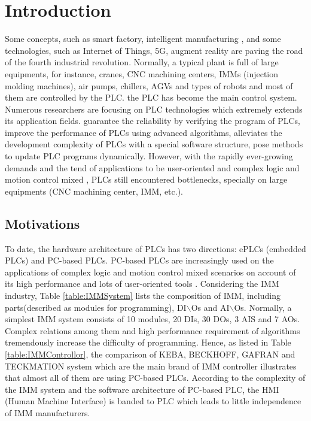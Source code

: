 \documentclass[journal,UTF8]{IEEEtran}
\begin{document}
\section{Introduction}
Some concepts, such as smart factory, intelligent manufacturing \cite{Gonzalez2017Supervisory,Chekired2018Industrial}, and some technologies, such as Internet of Things, 5G, augment reality \cite{Li2018Energy,Ling20185G} are paving the road of the fourth industrial revolution. Normally, a typical plant is full of large equipments, for instance, cranes, CNC machining centers, IMMs (injection molding machines), air pumps, chillers, AGVs and types of robots and most of them are controlled by the PLC. the PLC has become the main control system. Numerous researchers are focusing on PLC technologies which extremely extends its application fields. \cite{Carlsson2012Methods,Obermeier2015A,Adiego2015Applying} guarantee the reliability by verifying the program of PLCs, \cite{Gerk2006Advanced,Chang2007Adaptive,Dominic2016PLC} improve the performance of PLCs using advanced algorithms, \cite{WuA} alleviates the development complexity of PLCs with a special software structure, \cite{Sch2013Development,Morenas2017Shop} pose methods to update PLC programs dynamically.
However, with the rapidly ever-growing demands and the tend of applications to be user-oriented and complex logic and motion control mixed \cite{Zaeh2005A,Hossain2014Advanced}, PLCs still encountered bottlenecks, specially on large equipments (CNC machining center, IMM, etc.).

\subsection{Motivations}
To date, the hardware architecture of PLCs has two directions: ePLCs (embedded PLCs) and PC-based PLCs. PC-based PLCs are increasingly used on the applications of complex logic and motion control mixed scenarios on account of its high performance and lots of user-oriented tools \cite{Hossain2014Advanced}. Considering the IMM industry, Table \ref{table:IMMSystem} lists the composition of IMM, including parts(described as modules for programming), DI$\backslash$Os and AI$\backslash$Os. Normally, a simplest IMM system consists of 10 modules, 20 DIs, 30 DOs, 3 AIS and 7 AOs. Complex relations among them and high performance requirement of algorithms tremendously increase the difficulty of programming. Hence, as listed in Table \ref{table:IMMControllor}, the comparison of KEBA, BECKHOFF, GAFRAN and TECKMATION system which are the main brand of IMM controller illustrates that almost all of them are using PC-based PLCs. According to the complexity of the IMM system and the software architecture of PC-based PLC, the HMI (Human Machine Interface) is banded to PLC which leads to little independence of IMM manufacturers. 
\end{document}
